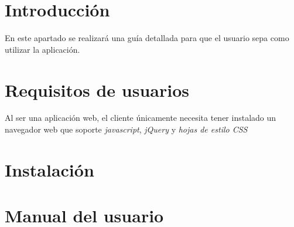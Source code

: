 
\section{Introducción}

En este apartado se realizará una guía detallada para que el usuario sepa como utilizar la aplicación.

\section{Requisitos de usuarios}

Al ser una aplicación web, el cliente únicamente necesita tener instalado un navegador web que soporte \textit{javascript}, \textit{jQuery} y \textit{hojas de estilo CSS}

\section{Instalación}

\section{Manual del usuario}


